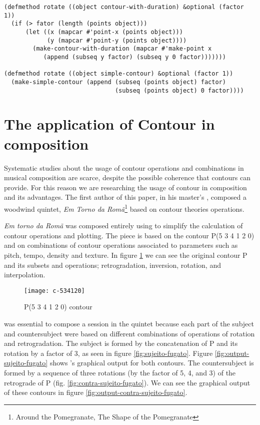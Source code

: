 \begin{figure*}
\begin{verbatim}
(defmethod rotate ((object contour-with-duration) &optional (factor 1))
  (if (> fator (length (points object)))
      (let ((x (mapcar #'point-x (points object)))
            (y (mapcar #'point-y (points object))))
        (make-contour-with-duration (mapcar #'make-point x
           (append (subseq y factor) (subseq y 0 factor)))))))

(defmethod rotate ((object simple-contour) &optional (factor 1))
  (make-simple-contour (append (subseq (points object) factor)
                               (subseq (points object) 0 factor))))
\end{verbatim}
  \caption{Multi-methods}
  \label{fig:code-methods}
\end{figure*}

\section{The application of Contour in composition}
\label{sec:cont-appl-comp}

Systematic studies about the usage of contour operations and
combinations in musical composition are scarce, despite the possible
coherence that contours can provide. For this reason we are
researching the usage of contour in composition and its advantages.
The first author of this paper, in his master's \cite{sampaio08:em},
composed a woodwind quintet, \textit{Em Torno da Romã}\footnote{Around
  the Pomegranate, The Shape of the Pomegranate} based on contour
theories operations. 

\textit{Em torno da Romã} was composed entirely using \goiaba{} to
simplify the calculation of contour operations and plotting. The piece
is based on the contour P(5 3 4 1 2 0) and on combinations of contour
operations associated to parameters such as pitch, tempo, density and
texture. In figure \ref{fig:c-534120} we can see the original contour
P and its subsets and operations; retrogradation, inversion, rotation,
and interpolation.

\begin{figure}
  \centering
  \texttt{[image: c-534120]}
  \caption{P(5 3 4 1 2 0) contour}
  \label{fig:c-534120}
\end{figure}

\goiaba{} was essential to compose a  session in the
quintet because each part of the subject and countersubject were based
on different combinations of operations of rotation and
retrogradation. The subject is formed by the concatenation of P and
its rotation by a factor of 3, as seen in figure
\ref{fig:sujeito-fugato}. Figure \ref{fig:output-sujeito-fugato} shows
\goiaba{}'s graphical output for both contours. The countersubject is
formed by a sequence of three rotations (by the factor of 5, 4, and 3)
of the retrograde of P (fig. \ref{fig:contra-sujeito-fugato}). We can
see the graphical output of these contours in figure
\ref{fig:output-contra-sujeito-fugato}.

